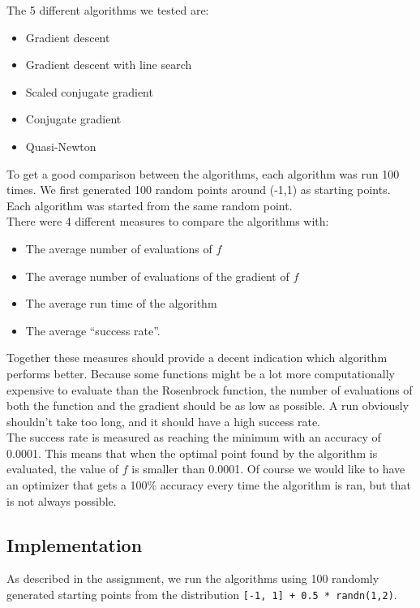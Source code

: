 \documentclass{article}
\begin{document}
\newpage
The 5 different algorithms we tested are:
\begin{itemize}
\item Gradient descent
\item Gradient descent with line search
\item Scaled conjugate gradient
\item Conjugate gradient
\item Quasi-Newton
\end{itemize}

To get a good comparison between the algorithms, each algorithm was run 100 times.
We first generated 100 random points around (-1,1) as starting points. Each algorithm was started from the same random point.\\

There were 4 different measures to compare the algorithms with:
\begin{itemize}
\item The average number of evaluations of $f$
\item The average number of evaluations of the gradient of $f$
\item The average run time of the algorithm
\item The average ``success rate''. 
\end{itemize}

Together these measures should provide a decent indication which algorithm performs better. Because some functions might be a lot more computationally expensive to evaluate than the Rosenbrock function, the number of evaluations of both the function and the gradient should be as low as possible. A run obviously shouldn't take too long, and it should have a high success rate. \\

The success rate is measured as reaching the minimum with an accuracy of 0.0001. This means that when the optimal point found by the algorithm is evaluated, the value of $f$ is smaller than 0.0001. Of course we would like to have an optimizer that gets a 100\% accuracy every time the algorithm is ran, but that is not always possible. 

\subsection{Implementation}
As described in the assignment, we run the algorithms using 100 randomly generated starting points from the distribution \texttt{[-1, 1] + 0.5 * randn(1,2)}. 
\end{document}
